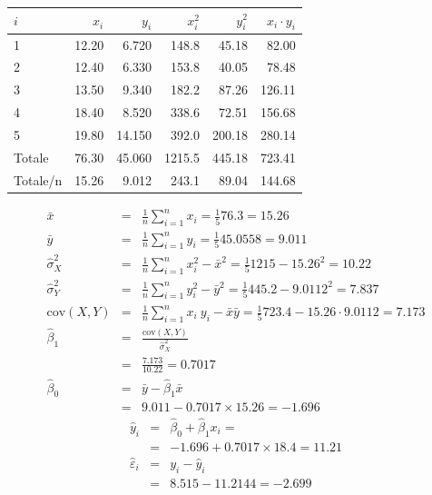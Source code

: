 \documentclass[
  11pt,
]{book}
\theoremstyle{mytheoremstyle}
\theoremstyle{mydefstyle}
\newenvironment{sol}
  {
  \begin{tcolorbox}[enhanced,breakable,arc=0.1mm,boxrule=1pt,colback=white,colframe=iblue,
  title=\bf \fontfamily{lmss}\selectfont \hspace{.5 cm} Soluzione,drop fuzzy shadow]

}{
\end{tcolorbox}
  }
\begin{document}
\begin{sol}

\begin{table}[H]
\centering
\begin{tabular}{lrrrrr}
\toprule
$i$ & $x_i$ & $y_i$ & $x_i^2$ & $y_i^2$ & $x_i\cdot y_i$\\
\midrule
1 & 12.20 & 6.720 & 148.8 & 45.18 & 82.00\\
2 & 12.40 & 6.330 & 153.8 & 40.05 & 78.48\\
3 & 13.50 & 9.340 & 182.2 & 87.26 & 126.11\\
4 & 18.40 & 8.520 & 338.6 & 72.51 & 156.68\\
5 & 19.80 & 14.150 & 392.0 & 200.18 & 280.14\\
Totale & 76.30 & 45.060 & 1215.5 & 445.18 & 723.41\\
Totale/n & 15.26 & 9.012 & 243.1 & 89.04 & 144.68\\
\bottomrule
\end{tabular}
\end{table}

\begin{eqnarray*}
           \bar x &=&\frac 1 n\sum_{i=1}^n x_i = \frac {1}{ 5 }  76.3 =  15.26 \\
           \bar y &=&\frac 1 n\sum_{i=1}^n y_i = \frac {1}{ 5 }  45.0558 =  9.011 \\
           \hat\sigma_X^2&=&\frac 1 n\sum_{i=1}^n x_i^2-\bar x^2=\frac {1}{ 5 }  1215  - 15.26 ^2= 10.22 \\
           \hat\sigma_Y^2&=&\frac 1 n\sum_{i=1}^n y_i^2-\bar y^2=\frac {1}{ 5 }  445.2  - 9.0112 ^2= 7.837 \\
           \text{cov}(X,Y)&=&\frac 1 n\sum_{i=1}^n x_i~y_i-\bar x\bar y=\frac {1}{ 5 }  723.4 - 15.26 \cdot 9.0112 = 7.173 \\
           \hat\beta_1 &=& \frac{\text{cov}(X,Y)}{\hat\sigma_X^2} \\
                    &=& \frac{ 7.173 }{ 10.22 }  =  0.7017 \\
           \hat\beta_0 &=& \bar y - \hat\beta_1 \bar x\\
                    &=&  9.011 - 0.7017 \times  15.26 = -1.696 
         \end{eqnarray*}\begin{eqnarray*}
\hat y_i &=&\hat\beta_0+\hat\beta_1 x_i=\\ 
&=& -1.696 + 0.7017 \times 18.4 = 11.21 \\ 
\hat \varepsilon_i &=& y_i-\hat y_i\\ 
&=& 8.515 - 11.2144 = -2.699  
\end{eqnarray*}

\end{sol}
\end{document}

